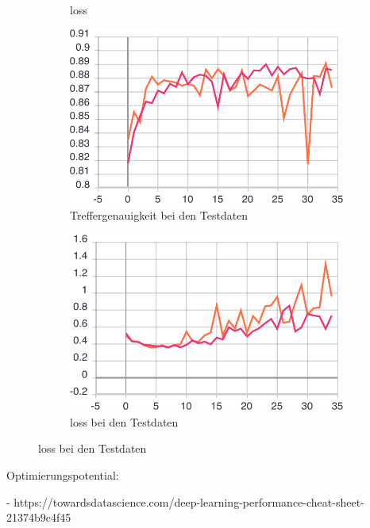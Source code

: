 \begin{figure}[ht]
\begin{subfigure}[b]{0.5\linewidth}
    \caption{loss} 
    \label{image-class-results:b} 
    \vspace{2ex}
  \end{subfigure} 
  \begin{subfigure}[b]{0.5\linewidth}
    \centering
    \includegraphics[width=0.75\linewidth]{graphics/image-classification-results/val_acc.pdf} 
    \caption{Treffergenauigkeit bei den Testdaten} 
    \label{image-class-results:c} 
  \end{subfigure}%
  \begin{subfigure}[b]{0.5\linewidth}
    \centering
    \includegraphics[width=0.75\linewidth]{graphics/image-classification-results/val_loss.pdf} 
    \caption{loss bei den Testdaten} 
    \label{image-class-results:d} 
  \end{subfigure}
  \centering
\end{figure}




Optimierungspotential:

- https://towardsdatascience.com/deep-learning-performance-cheat-sheet-21374b9c4f45

